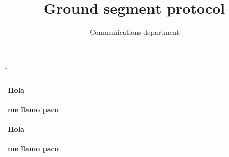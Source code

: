 \documentclass[12pt,a4paper]{report}
\title{Ground segment protocol}
\author{Communications department}
\begin{document}
\begin{tabbing}
 \hspace{5cm}\=\kill
  \paragraph{Hola} \paragraph{me llamo paco} \> \paragraph{Hola} \paragraph{me llamo paco}
 \end{tabbing}  
\end{document}
